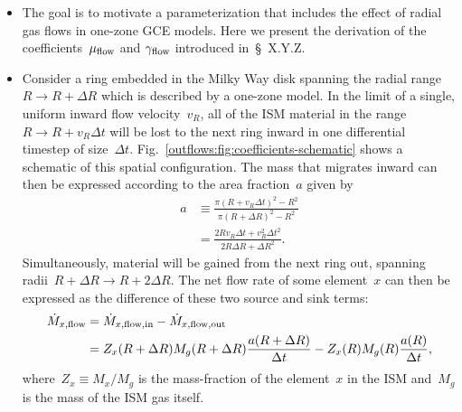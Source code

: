 \documentclass[main.tex]{subfiles}
\begin{document}
\begin{itemize}

	\item The goal is to motivate a parameterization that includes the effect
	of radial gas flows in one-zone GCE models.
	Here we present the derivation of the coefficients~$\mu_{\text{flow}}$ and
	$\gamma_{\text{flow}}$ introduced in~\S~X.Y.Z.

	\item Consider a ring embedded in the Milky Way disk spanning the radial
	range~$R \rightarrow R + \Delta R$ which is described by a one-zone model.
	In the limit of a single, uniform inward flow velocity~$v_R$, all of the
	ISM material in the range~$R \rightarrow R + v_R \Delta t$ will be lost
	to the next ring inward in one differential timestep of size~$\Delta t$.
	Fig.~\ref{outflows:fig:coefficients-schematic} shows a schematic of this
	spatial configuration.
	The mass that migrates inward can then be expressed according to the
	area fraction~$a$ given by
	\begin{equation}\begin{split}
	a &\equiv \frac{
		\pi \left(R + v_R \Delta t\right)^2 - R^2
	}{
		\pi \left(R + \Delta R\right)^2 - R^2
	}
	\\
	&= \frac{
		2 R v_R \Delta t + v_R^2 \Delta t^2
	}{
		2 R \Delta R + \Delta R^2
	}.
	\label{outflows:eq:area-frac-def}
	\end{split}\end{equation}
	Simultaneously, material will be gained from the next ring out, spanning
	radii~$R + \Delta R \rightarrow R + 2\Delta R$.
	The net flow rate of some element~$x$ can then be expressed as the
	difference of these two source and sink terms:
	\begin{equation}\begin{split}
	\dot{M}_{x,\text{flow}} &= \dot{M}_{x,\text{flow},\text{in}} -
	\dot{M}_{x,\text{flow},\text{out}}
	\\
	&= Z_x(R + \Delta R) M_g(R + \Delta R) \frac{a(R + \Delta R)}{\Delta t} -
	Z_x(R) M_g(R) \frac{a(R)}{\Delta t},
	\label{outflows:eq:flowin-minus-flowout}
	\end{split}\end{equation}
	where~$Z_x \equiv M_x / M_g$ is the mass-fraction of the element~$x$ in the
	ISM and~$M_g$ is the mass of the ISM gas itself.


\end{itemize}
\end{document}
